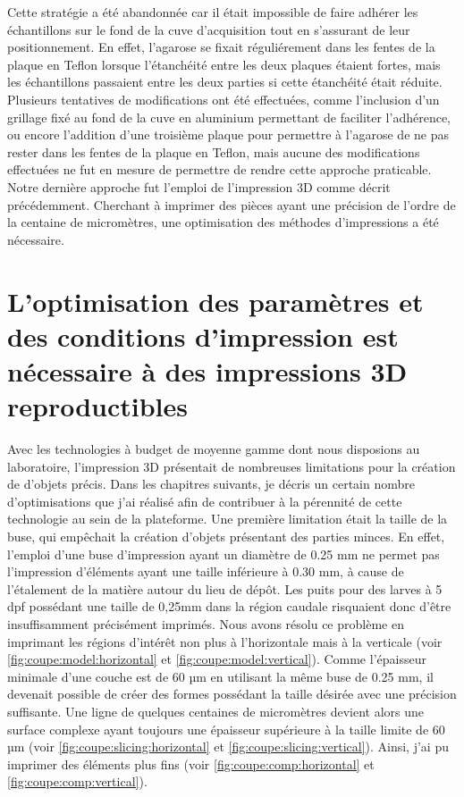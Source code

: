 \documentclass[\main/main.tex]{subfiles}
\begin{document}
%
Cette stratégie a été abandonnée car il était impossible de faire adhérer les échantillons sur le fond de la cuve d'acquisition tout en s'assurant de leur positionnement.
%
En effet, l'agarose se fixait réguliérement dans les fentes de la plaque en Teflon lorsque l'étanchéité entre les deux plaques étaient fortes, mais les échantillons passaient entre les deux parties si cette étanchéité était réduite.
%
Plusieurs tentatives de modifications ont été effectuées, comme l'inclusion d'un grillage fixé au fond de la cuve en aluminium permettant de faciliter l'adhérence, ou encore l'addition d'une troisième plaque pour permettre à l'agarose de ne pas rester dans les fentes de la plaque en Teflon, mais aucune des modifications effectuées ne fut en mesure de permettre de rendre cette approche praticable.
%
Notre dernière approche fut l'emploi de l'impression 3D comme décrit précédemment.
%
Cherchant à imprimer des pièces ayant une précision de l'ordre de la centaine de micromètres, une optimisation des méthodes d'impressions a été nécessaire. 

    \section{L'optimisation des paramètres et des conditions d'impression est nécessaire à des impressions 3D reproductibles}

%
Avec les technologies à budget de moyenne gamme dont nous disposions au laboratoire, l'impression 3D présentait de nombreuses limitations pour la création de d'objets précis. Dans les chapitres suivants, je décris un certain nombre d'optimisations que j'ai réalisé afin de contribuer à la pérennité de cette technologie au sein de la plateforme.
%
Une première limitation était la taille de la buse, qui empêchait la création d'objets présentant des parties minces.
%
En effet, l'emploi d'une buse d'impression ayant un diamètre de 0.25 mm ne permet pas l'impression d'éléments ayant une taille inférieure à 0.30 mm, à cause de l'étalement de la matière autour du lieu de dépôt. Les puits pour des larves à 5 dpf possédant une taille de 0,25mm dans la région caudale risquaient donc d'être insuffisamment précisément imprimés.
%
Nous avons résolu ce problème en imprimant les régions d'intérêt non plus à l'horizontale mais à la verticale (voir \autoref{fig:coupe:model:horizontal} et \autoref{fig:coupe:model:vertical}). Comme l'épaisseur minimale d'une couche est de 60 µm en utilisant la même buse de 0.25 mm, il devenait possible de créer des formes possédant la taille désirée avec une précision suffisante.
%
Une ligne de quelques centaines de micromètres devient alors une surface complexe ayant toujours une épaisseur supérieure à la taille limite de 60 µm  (voir \autoref{fig:coupe:slicing:horizontal} et \autoref{fig:coupe:slicing:vertical}).
%
Ainsi, j'ai pu imprimer des éléments plus fins (voir \autoref{fig:coupe:comp:horizontal} et \autoref{fig:coupe:comp:vertical}).
\end{document}
